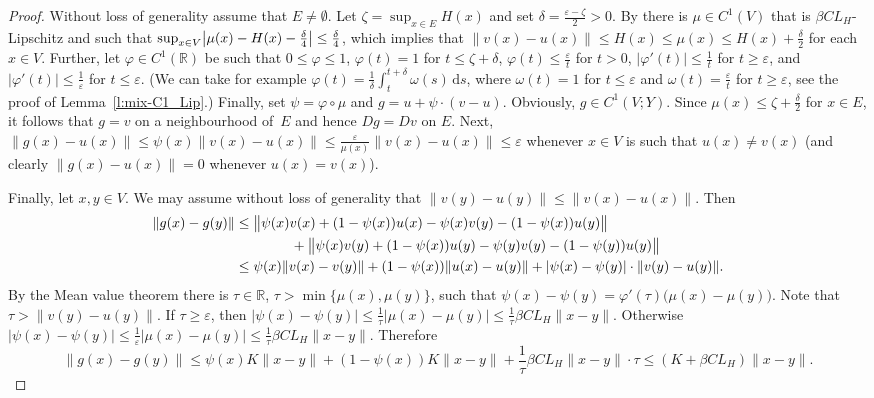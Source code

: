\documentclass[a4paper,twoside,10pt,reqno,draft]{amsart}
\let\comp=\circ
\theoremstyle{definition}
\theoremstyle{remark}
\newcommand\abs[1]{\mathopen|#1\mathclose|}
\newcommand\absb[2]{\csname#1l\endcsname|#2\csname#1r\endcsname|}
\newcommand\norm[1]{\mathopen\|#1\mathclose\|}
\newcommand\normb[2]{\csname#1l\endcsname\|#2\csname#1r\endcsname\|}
\newcommand\de{\delta}
\newcommand\ve{\varepsilon}
\newcommand\vp{\varphi}
\newcommand\om{\omega}
\newcommand\R{{\mathbb R}}
\renewcommand\d{\,\mathrm{d}}
\begin{document}
\begin{proof}
Without loss of generality assume that $E\neq\emptyset$.
Let $\zeta=\sup_{x\in E}H(x)$ and set $\de=\frac{\ve-\zeta}2>0$.
By \cite[Theorem~7.86]{HJ} there is $\mu\in C^1(V)$ that is $\beta CL_H$-Lipschitz and such that $\sup_{x\in V}\absb{big}{\mu(x)-H(x)-\frac\de4}\le\frac\de4$,
which implies that $\norm{v(x)-u(x)}\le H(x)\le\mu(x)\le H(x)+\frac\de2$ for each $x\in V$.
Further, let $\vp\in C^1(\R)$ be such that $0\le\vp\le1$, $\vp(t)=1$ for $t\le\zeta+\de$, $\vp(t)\le\frac\ve t$ for $t>0$, $\abs{\vp'(t)}\le\frac1t$ for $t\ge\ve$, and $\abs{\vp'(t)}\le\frac1\ve$ for $t\le\ve$.
(We can take for example $\vp(t)=\frac1\de\int_t^{t+\de}\om(s)\d s$, where $\om(t)=1$ for $t\le\ve$ and $\om(t)=\frac\ve t$ for $t\ge\ve$, see the proof of Lemma~\ref{l:mix-C1_Lip}.)
Finally, set $\psi=\vp\comp\mu$ and $g=u+\psi\cdot(v-u)$.
Obviously, $g\in C^1(V;Y)$.
Since $\mu(x)\le\zeta+\frac\de2$ for $x\in E$, it follows that $g=v$ on a neighbourhood of~$E$ and hence $Dg=Dv$ on $E$.
Next, $\norm{g(x)-u(x)}\le\psi(x)\norm{v(x)-u(x)}\le\frac\ve{\mu(x)}\norm{v(x)-u(x)}\le\ve$ whenever $x\in V$ is such that $u(x)\neq v(x)$
(and clearly $\norm{g(x)-u(x)}=0$ whenever $u(x)=v(x)$).

Finally, let $x,y\in V$.
We may assume without loss of generality that $\norm{v(y)-u(y)}\le\norm{v(x)-u(x)}$.
Then
\[\begin{split}
\norm{g(x)-g(y)}&\le\normb{big}{\psi(x)v(x)+(1-\psi(x))u(x)-\psi(x)v(y)-(1-\psi(x))u(y)}\\
&\qquad\qquad+\normb{big}{\psi(x)v(y)+(1-\psi(x))u(y)-\psi(y)v(y)-(1-\psi(y))u(y)}\\
&\le\psi(x)\norm{v(x)-v(y)}+(1-\psi(x))\norm{u(x)-u(y)}+\abs{\psi(x)-\psi(y)}\cdot\norm{v(y)-u(y)}.
\end{split}\]
By the Mean value theorem there is $\tau\in\R$, $\tau>\min\{\mu(x),\mu(y)\}$, such that $\psi(x)-\psi(y)=\vp'(\tau)\bigl(\mu(x)-\mu(y)\bigr)$.
Note that $\tau>\norm{v(y)-u(y)}$.
If $\tau\ge\ve$, then $\abs{\psi(x)-\psi(y)}\le\frac1\tau\abs{\mu(x)-\mu(y)}\le\frac1\tau\beta CL_H\norm{x-y}$.
Otherwise $\abs{\psi(x)-\psi(y)}\le\frac1\ve\abs{\mu(x)-\mu(y)}\le\frac1\tau\beta CL_H\norm{x-y}$.
Therefore
\[
\norm{g(x)-g(y)}\le\psi(x)K\norm{x-y}+(1-\psi(x))K\norm{x-y}+\frac1\tau\beta CL_H\norm{x-y}\cdot\tau\le(K+\beta CL_H)\norm{x-y}.
\]
\end{proof}
\end{document}

